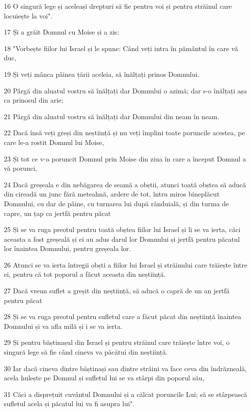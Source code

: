 \par 16 O singură lege și aceleași drepturi să fie pentru voi și pentru străinul care locuiește la voi".
\par 17 Și a grăit Domnul cu Moise și a zis:
\par 18 "Vorbește fiilor lui Israel și le spune: Când veți intra în pământul în care vă duc,
\par 19 Și veți mânca pâinea țării aceleia, să înălțați prinos Domnului.
\par 20 Pârgă din aluatul vostru să înălțați dar Domnului o azimă; dar s-o înălțați așa ca prinosul din arie;
\par 21 Pârgă din aluatul vostru să înălțați dar Domnului din neam în neam.
\par 22 Dacă însă veți greși din neștiință și nu veți împlini toate poruncile acestea, pe care le-a rostit Domnul lui Moise,
\par 23 Și tot ce v-a poruncit Domnul prin Moise din ziua în care a început Domnul a vă porunci,
\par 24 Dacă greșeala e din nebăgarea de seamă a obștii, atunci toată obștea să aducă din cireadă un junc fără meteahnă, ardere de tot, întru miros bineplăcut Domnului, cu dar de pâine, cu turnarea lui după rânduială, și din turma de capre, un țap ca jertfă pentru păcat
\par 25 Și se va ruga preotul pentru toată obștea fiilor lui Israel și li se va ierta, căci aceasta a fost greșeală și ei au adus darul lor Domnului și jertfă pentru păcatul lor înaintea Domnului, pentru greșeala lor.
\par 26 Atunci se va ierta întregii obști a fiilor lui Israel și străinului care trăiește între ei, pentru că tot poporul a făcut aceasta din neștiință.
\par 27 Dacă vreun suflet a greșit din neștiință, să aducă o capră de un an jertfă pentru păcat
\par 28 Și se va ruga preotul pentru sufletul care a făcut păcat din neștiință înaintea Domnului și va afla milă și i se va ierta.
\par 29 Și pentru băștinașul din Israel și pentru străinul care trăiește între voi, o singură lege să fie când cineva va păcătui din neștiință.
\par 30 Iar dacă cineva dintre băștinași sau dintre străini va face ceva din îndrăzneală, acela hulește pe Domnul și sufletul lui se va stârpi din poporul său,
\par 31 Căci a disprețuit cuvântul Domnului și a călcat poruncile Lui; să se stârpească sufletul acela și păcatul lui va fi asupra lui".
